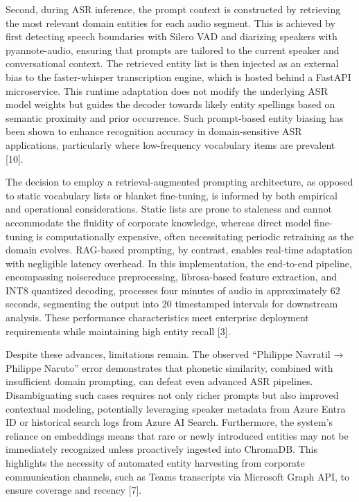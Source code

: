\documentclass[12pt,a4paper]{article}
\begin{document}
Second, during ASR inference, the prompt context is constructed by retrieving the most relevant domain entities for each audio segment. This is achieved by first detecting speech boundaries with Silero VAD and diarizing speakers with pyannote-audio, ensuring that prompts are tailored to the current speaker and conversational context. The retrieved entity list is then injected as an external bias to the faster-whisper transcription engine, which is hosted behind a FastAPI microservice. This runtime adaptation does not modify the underlying ASR model weights but guides the decoder towards likely entity spellings based on semantic proximity and prior occurrence. Such prompt-based entity biasing has been shown to enhance recognition accuracy in domain-sensitive ASR applications, particularly where low-frequency vocabulary items are prevalent [10].


The decision to employ a retrieval-augmented prompting architecture, as opposed to static vocabulary lists or blanket fine-tuning, is informed by both empirical and operational considerations. Static lists are prone to staleness and cannot accommodate the fluidity of corporate knowledge, whereas direct model fine-tuning is computationally expensive, often necessitating periodic retraining as the domain evolves. RAG-based prompting, by contrast, enables real-time adaptation with negligible latency overhead. In this implementation, the end-to-end pipeline, encompassing noisereduce preprocessing, librosa-based feature extraction, and INT8 quantized decoding, processes four minutes of audio in approximately 62 seconds, segmenting the output into 20 timestamped intervals for downstream analysis. These performance characteristics meet enterprise deployment requirements while maintaining high entity recall [3].


Despite these advances, limitations remain. The observed “Philippe Navratil → Philippe Naruto” error demonstrates that phonetic similarity, combined with insufficient domain prompting, can defeat even advanced ASR pipelines. Disambiguating such cases requires not only richer prompts but also improved contextual modeling, potentially leveraging speaker metadata from Azure Entra ID or historical search logs from Azure AI Search. Furthermore, the system’s reliance on embeddings means that rare or newly introduced entities may not be immediately recognized unless proactively ingested into ChromaDB. This highlights the necessity of automated entity harvesting from corporate communication channels, such as Teams transcripts via Microsoft Graph API, to ensure coverage and recency [7].
\end{document}
